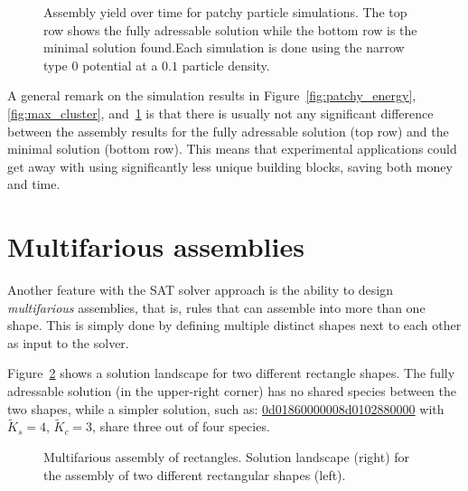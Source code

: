 \begin{figure}[h]
    \centering
    \caption{Assembly yield over time for patchy particle simulations. The top row shows the fully adressable solution while the bottom row is the minimal solution found.Each simulation is done using the narrow type \(0\) potential at a \(0.1\) particle density.}
    \label{fig:complete_clusters}
\end{figure}

A general remark on the simulation results in Figure~\ref{fig:patchy_energy}, \ref{fig:max_cluster}, and~\ref{fig:complete_clusters} is that there is usually not any significant difference between the assembly results for the fully adressable solution (top row) and the minimal solution (bottom row). This means that experimental applications could get away with using significantly less unique building blocks, saving both money and time.

\section{Multifarious assemblies}

Another feature with the SAT solver approach is the ability to design \emph{multifarious} assemblies, that is, rules that can assemble into more than one shape. This is simply done by defining multiple distinct shapes next to each other as input to the solver.

Figure~\ref{fig:multifarious_rectangles} shows a solution landscape for two different rectangle shapes. The fully adressable solution (in the upper-right corner) has no shared species between the two shapes, while a simpler solution, such as: \href{https://akodiat.github.io/polycubes/?assemblyMode=stochastic&rule=0d01860000000501860000000905020000008d0102880000}{0d0186000000\allowbreak8d0102880000}
with \(\widetilde{K}_s=4\), \(\widetilde{K}_c=3\), share three out of four species.

\begin{figure}[h]
    \centering
    \caption{Multifarious assembly of rectangles. Solution landscape (right) for the assembly of two different rectangular shapes (left).}
    \label{fig:multifarious_rectangles}
\end{figure}